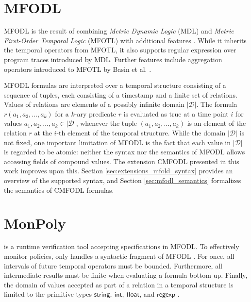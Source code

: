 \section{MFODL}
MFODL \cite{basinFormallyVerifiedOptimized2020} is the result of combining \textit{Metric Dynamic Logic} (MDL) \cite{dankrsticAlmostEventRateIndependent} and \textit{Metric First-Order Temporal Logic} (MFOTL) \cite{chomickiEfficientCheckingTemporal1995} with additional features \cite{traytel16MetricFirstOrder}. While it inherits the temporal operators from MFOTL, it also supports regular expression over program traces introduced by MDL. Further features include aggregation operators introduced to MFOTL by Basin et al. \cite{basinMonitoringTemporalFirstorder2015}.

MFODL formulas are interpreted over a temporal structure consisting of a sequence of tuples, each consisting of a timestamp and a finite set of relations. Values of relations are elements of a possibly infinite domain $|\mathcal{D}|$. The formula $r(a_1, a_2, \dots, a_k)$ for a $k$-ary predicate $r$ is evaluated as true at a time point $i$ for values $a_1, a_2, \dots, a_k \in |\mathcal{D}|$, whenever the tuple $(a_1, a_2, \dots, a_k)$ is an element of the relation $r$ at the $i$-th element of the temporal structure. While the domain $|\mathcal{D}|$ is not fixed, one important limitation of MFODL is the fact that each value in $|\mathcal{D}|$ is regarded to be atomic: neither the syntax nor the semantics of MFODL allows accessing fields of compound values. The extension CMFODL presented in this work improves upon this. Section \ref{sec:extensions_mfold_syntax} provides an overview of the supported syntax, and Section \ref{sec:mfodl_semantics} formalizes the semantics of CMFODL formulas.

\section{MonPoly}
\label{sec:backgroun_monpoly}
\MonPoly is a runtime verification tool accepting specifications in MFODL. To effectively monitor policies, \MonPoly only handles a syntactic fragment of MFODL \cite{basinMonPolyMonitoringTool2017}. For once, all intervals of future temporal operators must be bounded.  Furthermore, all intermediate results must be finite when evaluating a formula bottom-up. Finally, the domain of values accepted as part of a relation in a temporal structure is limited to the primitive types $\mathsf{string},\ \mathsf{int},\ \mathsf{float}$, and $\mathsf{regexp}$ \cite{basinMonPolyMonitoringTool2017}.

